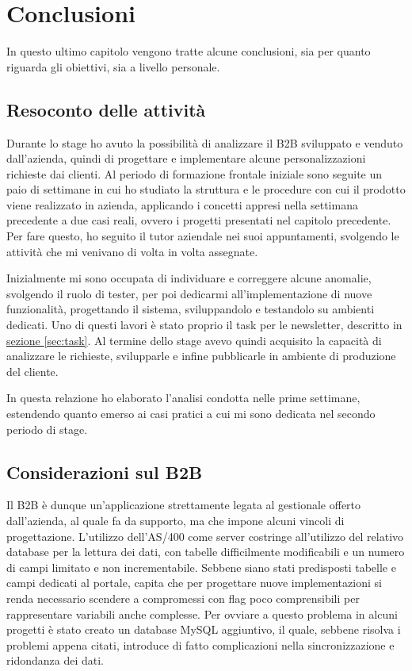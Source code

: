 \chapter{Conclusioni}
\begin{flushright}
	\parbox{13cm}{\small In questo ultimo capitolo vengono tratte alcune conclusioni, sia per quanto riguarda gli obiettivi, sia a livello personale.}
\end{flushright}

\section{Resoconto delle attività}
Durante lo stage ho avuto la possibilità di analizzare il B2B sviluppato e venduto dall'azienda, quindi di progettare e implementare alcune personalizzazioni richieste dai clienti. Al periodo di formazione frontale iniziale sono seguite un paio di settimane in cui ho studiato la struttura e le procedure con cui il prodotto viene realizzato in azienda, applicando i concetti appresi nella settimana precedente a due casi reali, ovvero i progetti presentati nel capitolo precedente. Per fare questo, ho seguito il tutor aziendale nei suoi appuntamenti, svolgendo le attività che mi venivano di volta in volta assegnate. 

Inizialmente mi sono occupata di individuare e correggere alcune anomalie, svolgendo il ruolo di tester, per poi dedicarmi all'implementazione di nuove funzionalità, progettando il sistema, sviluppandolo e testandolo su ambienti dedicati. Uno di questi lavori è stato proprio il task per le newsletter, descritto in \hyperref[sec:task]{sezione \ref{sec:task}}. Al termine dello stage avevo quindi acquisito la capacità di analizzare le richieste, svilupparle e infine pubblicarle in ambiente di produzione del cliente.

In questa relazione ho elaborato l'analisi condotta nelle prime settimane, estendendo quanto emerso ai casi pratici a cui mi sono dedicata nel secondo periodo di stage.

\section{Considerazioni sul B2B}
Il B2B è dunque un'applicazione strettamente legata al gestionale offerto dall'azienda, al quale fa da supporto, ma che impone alcuni vincoli di progettazione. L'utilizzo dell'AS/400 come server costringe all'utilizzo del relativo database per la lettura dei dati, con tabelle difficilmente modificabili e un numero di campi limitato e non incrementabile. Sebbene siano stati predisposti tabelle e campi dedicati al portale, capita che per progettare nuove implementazioni si renda necessario scendere a compromessi con flag poco comprensibili per rappresentare variabili anche complesse. Per ovviare a questo problema in alcuni progetti è stato creato un database MySQL aggiuntivo, il quale, sebbene risolva i problemi appena citati, introduce di fatto complicazioni nella sincronizzazione e ridondanza dei dati.

